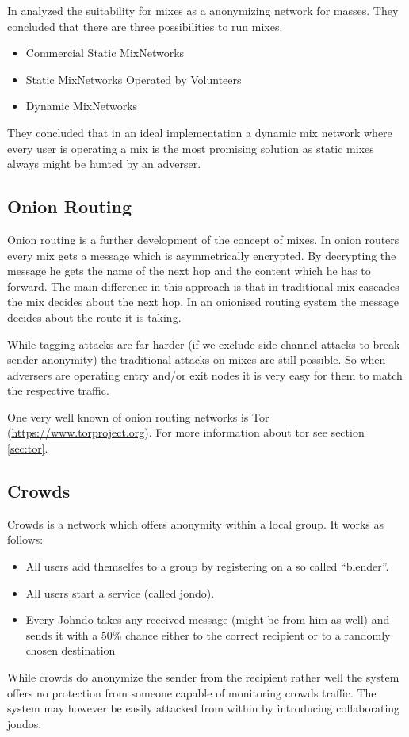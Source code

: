 In \citeyear{RP03-1} \citeauthor{RP03-1} analyzed the suitability for mixes as a anonymizing network for masses. They concluded that there are three possibilities to run mixes.
\begin{itemize}
	\item Commercial Static MixNetworks
	\item Static MixNetworks Operated by Volunteers
	\item Dynamic MixNetworks
\end{itemize}
They concluded that in an ideal implementation a dynamic mix network where every user is operating a mix is the most promising solution as static mixes always might be hunted by an adverser.

\subsection{Onion Routing}
Onion routing is a further development of the concept of mixes. In onion routers every mix gets a message which is asymmetrically encrypted. By decrypting the message he gets the name of the next hop and the content which he has to forward. The main difference in this approach is that in traditional mix cascades the mix decides about the next hop. In an onionised routing system the message decides about the route it is taking. 

While tagging attacks are far harder (if we exclude side channel attacks to break sender anonymity) the traditional attacks on mixes are still possible. So when adversers are operating entry and/or exit nodes it is very easy for them to match the respective traffic.

One very well known of onion routing networks is Tor (\href{https://www.torproject.org}{https://www.torproject.org}). For more information about tor see section \ref{sec:tor}.


\subsection{Crowds}
Crowds is a network which offers anonymity within a local group. It works as follows:
\begin{itemize}
	\item All users add themselfes to a group by registering on a so called ``blender''.
	\item All users start a service (called jondo).
	\item Every Johndo takes any received message (might be from him as well) and sends it with a 50\% chance either to the correct recipient or to a randomly chosen destination
\end{itemize}
While crowds do anonymize the sender from the recipient rather well the system offers no protection from someone capable of monitoring crowds traffic. The system may however be easily attacked from within by introducing collaborating jondos. 

